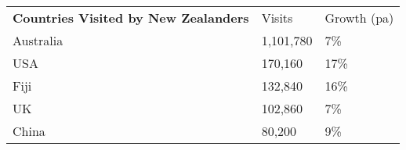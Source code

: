\begin{tabular}[t]{p{4.8cm}>{\hfill}p{1.3cm}>{\hfill}p{1.4cm}}
 \textbf{Countries Visited by New Zealanders} & Visits & Growth (pa) \\ 
 Australia & 1,101,780 & 7\% \\ 
  USA &   170,160 & 17\% \\ 
  Fiji &   132,840 & 16\% \\ 
  UK &   102,860 & 7\% \\ 
  China &    80,200 & 9\% \\ 
  \end{tabular}
